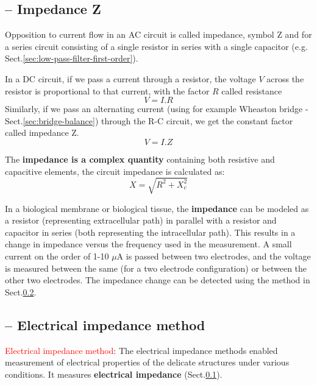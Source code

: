 \subsection{-- Impedance Z}
\label{sec:impedance}

Opposition to current flow in an AC circuit is called impedance, symbol Z and
for a series circuit consisting of a single resistor in series with a single
capacitor (e.g. Sect.\ref{sec:low-pass-filter-first-order}).

In a DC circuit, if we pass a current through a resistor, the voltage $V$
across the resistor is proportional to that current, with the factor $R$ called
resistance 
\begin{equation}
V = I . R
\end{equation}
Similarly, if we pass an alternating current (using for example Wheaston bridge
- Sect.\ref{sec:bridge-balance}) through the R-C circuit, we get the constant
factor called impedance Z.
\begin{equation}
V = I . Z
\end{equation}

The {\bf impedance is a complex quantity} containing both resistive and
capacitive elements, the circuit impedance is calculated as:
\begin{equation}
X = \sqrt{R^2 + X_c^2}
\end{equation}

In a biological membrane or biological tissue, the {\bf impedance} can be
modeled as a resistor (representing extracellular path) in parallel with a
resistor and capacitor in series (both representing the intracellular path).
This results in a change in impedance versus the frequency used in the
measurement. A small current on the order of 1-10 $\mu$A is passed between two
electrodes, and the voltage is measured between the same (for a two electrode
configuration) or between the other two electrodes.
The impedance  change can be detected using the method in
Sect.\ref{sec:electrical-impedance-method}.


 
\subsection{-- Electrical impedance method}
\label{sec:electrical-impedance-method}
\label{sec:impedance-detection-method}

\textcolor{red}{Electrical impedance method}: The electrical impedance methods
enabled measurement of electrical properties of the delicate structures under
various conditions. It measures {\bf electrical impedance}
(Sect.\ref{sec:impedance}).

